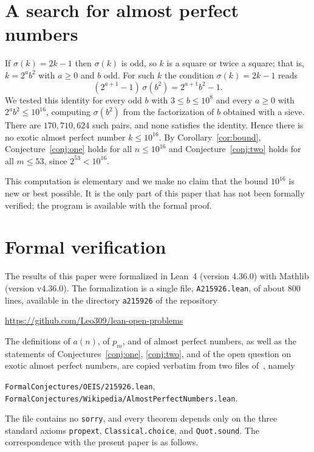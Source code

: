 \documentclass[12pt,reqno]{article}
\newcommand{\lean}[1]{\texttt{#1}}
\theoremstyle{plain}
\theoremstyle{definition}
\theoremstyle{remark}
\begin{document}
\section{A search for almost perfect numbers}\label{sec:computation}

If $\sigma(k) = 2k-1$ then $\sigma(k)$ is odd, so $k$ is a square or twice a
square; that is, $k = 2^a b^2$ with $a \ge 0$ and $b$ odd. For such $k$ the
condition $\sigma(k) = 2k-1$ reads
\[
  (2^{a+1}-1)\,\sigma(b^2) = 2^{a+1} b^2 - 1 .
\]
We tested this identity for every odd $b$ with $3 \le b \le 10^8$ and every
$a \ge 0$ with $2^a b^2 \le 10^{16}$, computing $\sigma(b^2)$ from the
factorization of $b$ obtained with a sieve. There are $170{,}710{,}624$ such
pairs, and none satisfies the identity. Hence there is no exotic almost perfect
number $k \le 10^{16}$. By Corollary~\ref{cor:bound}, Conjecture~\ref{conj:one}
holds for all $n \le 10^{16}$ and Conjecture~\ref{conj:two} holds for all
$m \le 53$, since $2^{53} < 10^{16}$.

This computation is elementary and we make no claim that the bound $10^{16}$ is
new or best possible. It is the only part of this paper that has not been
formally verified; the program is available with the formal proof.

\section{Formal verification}\label{sec:lean}

The results of this paper were formalized in Lean~4 (version 4.36.0) with
Mathlib (version v4.36.0). The formalization is a single file,
\lean{A215926.lean}, of about 800 lines, available in the directory
\lean{a215926} of the repository
\begin{center}
\url{https://github.com/Leo309/lean-open-problems}
\end{center}
The definitions of $a(n)$, of $p_m$, and of almost perfect numbers, as well as
the statements of Conjectures~\ref{conj:one}, \ref{conj:two}, and of the open
question on exotic almost perfect numbers, are copied verbatim from two files
of~\cite{fc}, namely
\begin{center}
\lean{FormalConjectures/OEIS/215926.lean},\\
\lean{FormalConjectures/Wikipedia/AlmostPerfectNumbers.lean}.
\end{center}
The
file contains no \lean{sorry}, and every theorem depends only on the three
standard axioms \lean{propext}, \lean{Classical.choice}, and \lean{Quot.sound}.
The correspondence with the present paper is as follows.
\end{document}
